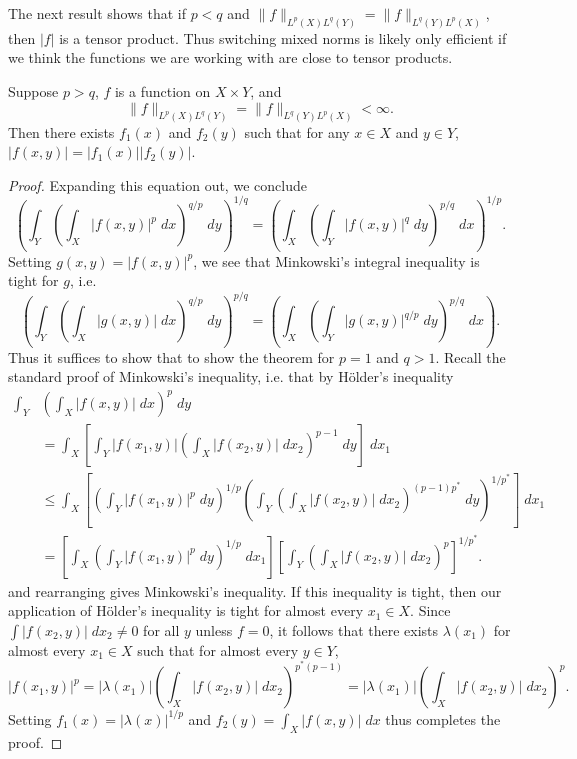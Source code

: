 The next result shows that if $p < q$ and $\| f \|_{L^p(X) L^q(Y)} = \| f \|_{L^q(Y) L^p(X)}$, then $|f|$ is a tensor product. Thus switching mixed norms is likely only efficient if we think the functions we are working with are close to tensor products.

\begin{theorem}
  Suppose $p > q$, $f$ is a function on $X \times Y$, and
  \[ \| f \|_{L^p(X) L^q(Y)} = \| f \|_{L^q(Y) L^p(X)} < \infty. \]
  Then there exists $f_1(x)$ and $f_2(y)$ such that for any $x \in X$ and $y \in Y$, $|f(x,y)| = |f_1(x)| |f_2(y)|$.
\end{theorem}
\begin{proof}
  Expanding this equation out, we conclude
  \[ \left( \int_Y \left( \int_X |f(x,y)|^p\; dx \right)^{q/p}\; dy \right)^{1/q} = \left( \int_X \left( \int_Y |f(x,y)|^q\; dy \right)^{p/q}\; dx \right)^{1/p}. \]
  Setting $g(x,y) = |f(x,y)|^p$, we see that Minkowski's integral inequality is tight for $g$, i.e.
  \[ \left( \int_Y \left( \int_X |g(x,y)|\; dx \right)^{q/p}\; dy \right)^{p/q} = \left( \int_X \left( \int_Y |g(x,y)|^{q/p}\; dy \right)^{p/q}\; dx \right). \]
  Thus it suffices to show that to show the theorem for $p = 1$ and $q > 1$. Recall the standard proof of Minkowski's inequality, i.e. that by H\"{o}lder's inequality
  \begin{align*}
    \int_Y & \left( \int_X |f(x,y)|\; dx \right)^p\; dy\\
    &= \int_X \left[ \int_Y |f(x_1,y)| \left( \int_X |f(x_2,y)|\; dx_2 \right)^{p-1}\; dy \right]\; dx_1\\
    &\leq \int_X \left[ \left( \int_Y |f(x_1,y)|^p\; dy \right)^{1/p} \left( \int_Y \left( \int_X |f(x_2,y)|\; dx_2 \right)^{(p-1)p^*}\; dy \right)^{1/p^*} \right]\; dx_1 \\
    &= \left[ \int_X \left( \int_Y |f(x_1,y)|^p\; dy \right)^{1/p}\; dx_1 \right] \left[ \int_Y \left( \int_X |f(x_2,y)|\; dx_2 \right)^p \right]^{1/p^*}.
  \end{align*}
  and rearranging gives Minkowski's inequality. If this inequality is tight, then our application of H\"{o}lder's inequality is tight for almost every $x_1 \in X$. Since $\int |f(x_2,y)|\; dx_2 \neq 0$ for all $y$ unless $f = 0$, it follows that there exists $\lambda(x_1)$ for almost every $x_1 \in X$ such that for almost every $y \in Y$,
  \[ |f(x_1,y)|^p = |\lambda(x_1)| \left( \int_X |f(x_2,y)|\; dx_2 \right)^{p^*(p-1)} = |\lambda(x_1)| \left( \int_X |f(x_2,y)|\; dx_2 \right)^p. \]
  Setting $f_1(x) = |\lambda(x)|^{1/p}$ and $f_2(y) = \int_X |f(x,y)|\; dx$ thus completes the proof.
\end{proof}

